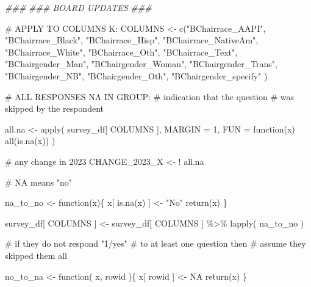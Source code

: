 \documentclass[
  letterpaper,
]{scrbook}
\newenvironment{Shaded}{\begin{snugshade}}{\end{snugshade}}
\newcommand{\AttributeTok}[1]{\textcolor[rgb]{0.40,0.45,0.13}{#1}}
\newcommand{\CommentTok}[1]{\textcolor[rgb]{0.37,0.37,0.37}{#1}}
\newcommand{\ConstantTok}[1]{\textcolor[rgb]{0.56,0.35,0.01}{#1}}
\newcommand{\ControlFlowTok}[1]{\textcolor[rgb]{0.00,0.23,0.31}{#1}}
\newcommand{\DecValTok}[1]{\textcolor[rgb]{0.68,0.00,0.00}{#1}}
\newcommand{\DocumentationTok}[1]{\textcolor[rgb]{0.37,0.37,0.37}{\textit{#1}}}
\newcommand{\FunctionTok}[1]{\textcolor[rgb]{0.28,0.35,0.67}{#1}}
\newcommand{\NormalTok}[1]{\textcolor[rgb]{0.00,0.23,0.31}{#1}}
\newcommand{\OtherTok}[1]{\textcolor[rgb]{0.00,0.23,0.31}{#1}}
\newcommand{\SpecialCharTok}[1]{\textcolor[rgb]{0.37,0.37,0.37}{#1}}
\newcommand{\StringTok}[1]{\textcolor[rgb]{0.13,0.47,0.30}{#1}}
\begin{document}
\begin{Shaded}
\begin{Highlighting}[]
\DocumentationTok{\#\#\#}
\DocumentationTok{\#\#\#   BOARD UPDATES}
\DocumentationTok{\#\#\#}

\CommentTok{\# APPLY TO COLUMNS K:}
\NormalTok{COLUMNS }\OtherTok{\textless{}{-}}  
  \FunctionTok{c}\NormalTok{(}\StringTok{"BChairrace\_AAPI"}\NormalTok{, }\StringTok{"BChairrace\_Black"}\NormalTok{, }
    \StringTok{"BChairrace\_Hisp"}\NormalTok{, }\StringTok{"BChairrace\_NativeAm"}\NormalTok{, }
    \StringTok{"BChairrace\_White"}\NormalTok{, }
    \StringTok{"BChairrace\_Oth"}\NormalTok{, }\StringTok{"BChairrace\_Text"}\NormalTok{, }
    \StringTok{"BChairgender\_Man"}\NormalTok{, }
    \StringTok{"BChairgender\_Woman"}\NormalTok{, }\StringTok{"BChairgender\_Trans"}\NormalTok{, }
    \StringTok{"BChairgender\_NB"}\NormalTok{, }
    \StringTok{"BChairgender\_Oth"}\NormalTok{, }\StringTok{"BChairgender\_specify"}\NormalTok{ )}

\CommentTok{\# ALL RESPONSES NA IN GROUP:}
\CommentTok{\# indication that the question}
\CommentTok{\# was skipped by the respondent}

\NormalTok{all.na }\OtherTok{\textless{}{-}} \FunctionTok{apply}\NormalTok{( survey\_df[ COLUMNS ], }
                 \AttributeTok{MARGIN =} \DecValTok{1}\NormalTok{, }
                 \AttributeTok{FUN =} \ControlFlowTok{function}\NormalTok{(x) }\FunctionTok{all}\NormalTok{(}\FunctionTok{is.na}\NormalTok{(x)) ) }

\CommentTok{\# any change in 2023}
\NormalTok{CHANGE\_2023\_X }\OtherTok{\textless{}{-}} \SpecialCharTok{!}\NormalTok{ all.na}

\CommentTok{\# NA means "no"}

\NormalTok{na\_to\_no }\OtherTok{\textless{}{-}} \ControlFlowTok{function}\NormalTok{(x)\{}
\NormalTok{  x[ }\FunctionTok{is.na}\NormalTok{(x) ] }\OtherTok{\textless{}{-}} \StringTok{"No"}
  \FunctionTok{return}\NormalTok{(x)}
\NormalTok{\}}

\NormalTok{survey\_df[ COLUMNS ] }\OtherTok{\textless{}{-}} 
\NormalTok{  survey\_df[ COLUMNS ] }\SpecialCharTok{\%\textgreater{}\%} 
  \FunctionTok{lapply}\NormalTok{( na\_to\_no )}

\CommentTok{\# if they do not respond "1/yes" }
\CommentTok{\# to at least one question then}
\CommentTok{\# assume they skipped them all}

\NormalTok{no\_to\_na }\OtherTok{\textless{}{-}} \ControlFlowTok{function}\NormalTok{( x, rowid )\{}
\NormalTok{  x[ rowid ] }\OtherTok{\textless{}{-}} \ConstantTok{NA}
  \FunctionTok{return}\NormalTok{(x)}
\NormalTok{\}}


\end{Highlighting}
\end{Shaded}
\end{document}

